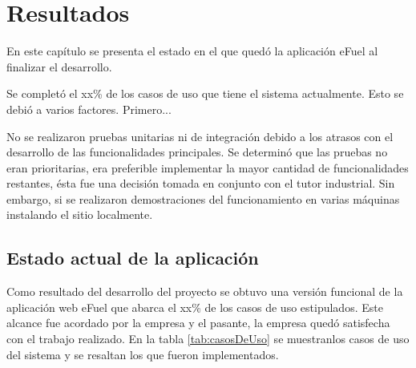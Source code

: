 \chapter{Resultados} \label{results}
En este capítulo se presenta el estado en el que quedó la aplicación eFuel al finalizar el desarrollo.

Se completó el xx\% de los casos de uso que tiene el sistema actualmente. Esto se debió a varios factores. Primero...

No se realizaron pruebas unitarias ni de integración debido a los atrasos con el desarrollo de las funcionalidades principales. Se determinó que las pruebas no eran prioritarias, era preferible implementar la mayor cantidad de funcionalidades restantes, ésta fue una decisión tomada en conjunto con el tutor industrial. Sin embargo, si se realizaron demostraciones del funcionamiento en varias máquinas instalando el sitio localmente.

\section{Estado actual de la aplicación}
Como resultado del desarrollo del proyecto se obtuvo una versión funcional de la aplicación web eFuel que abarca el xx\% de los casos de uso estipulados. Este alcance fue acordado por la empresa y el pasante, la empresa quedó satisfecha con el trabajo realizado. En la tabla \ref{tab:casosDeUso} se muestranlos casos de uso del sistema y se resaltan los que fueron implementados.

\newcommand\rownumber{\stepcounter{magicrownumbers}\arabic{magicrownumbers}}

